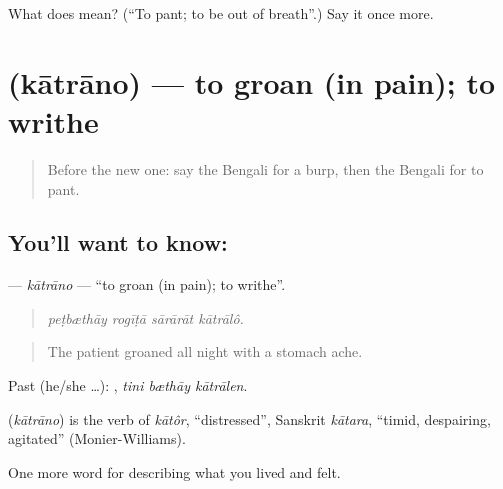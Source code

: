 \begin{tcolorbox}[breakable,colback=teal!4,colframe=teal!35!black,title={Before you move on}]
What does  mean? (\textquotedblleft{}To pant; to be out of breath\textquotedblright{}.) Say it once more.
\end{tcolorbox}
\section[\texorpdfstring{\bn{কাতরানো} (kātrāno)}{কাতরানো (kātrāno)}]{ (kātrāno) — to groan (in pain); to writhe}

\label{lesson:BN-C476-katrano}



\begin{quote}
Before the new one: say the Bengali for a burp, then the Bengali for to pant.
\end{quote}

\subsection*{You'll want to know: }
\textbf{} — \emph{kātrāno} — \textquotedblleft{}to groan (in pain); to writhe\textquotedblright{}.

\begin{quote}
   
\end{quote}

\begin{quote}
\emph{peṭbæthāy rogīṭā sārārāt kātrālô.}
\end{quote}

\begin{quote}
The patient groaned all night with a stomach ache.
\end{quote}

Past (he/she …):   , \emph{tini bæthāy kātrālen}.

\begin{cousinweb}
\textbf{} (\emph{kātrāno}) is the verb of \emph{kātôr}, \textquotedblleft{}distressed\textquotedblright{}, Sanskrit \emph{kātara}, \textquotedblleft{}timid, despairing, agitated\textquotedblright{} (Monier-Williams).
\end{cousinweb}

\begin{grammarlens}[title={What you've built}]
One more word for describing what you lived and felt.
\end{grammarlens}

